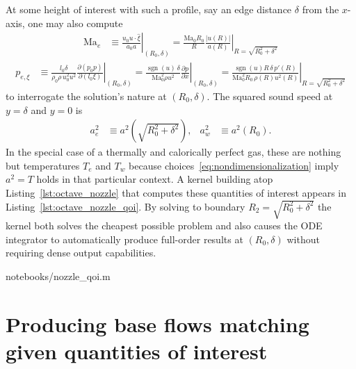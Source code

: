 \documentclass[letterpaper,11pt,nointlimits,reqno]{amsart}
\newcommand{\Mach}[1][]{\mbox{Ma}_{#1}}
\begin{document}
At some height of interest with such a profile, say an edge distance $\delta$
from the $x$-axis, one may also compute
\begin{align}
  \Mach[e]{}
  &\equiv
  \left. \frac{u_0 u\cdot\hat{\xi}}{a_0 a} \right|_{\left(R_0,\delta\right)}
  =
  \left.
    \frac{\Mach[0]{} R_0}{R}
    \frac{\left|u\!\left(R\right)\right|}
         {      a\!\left(R\right)       }
  \right|_{R = \sqrt{R_0^2 + \delta^2}}
\end{align}
\begin{align}
  p_{e,\xi}
  &\equiv
  \left.
  \frac{l_0 \delta}{\rho_0 \rho \, u_0^2 u^2}
    \frac{\partial\left(p_0 p\right)}{\partial\left(l_0 \xi\right)}
  \right|_{\left(R_0,\delta\right)}
  =
  \left.
    \frac{\operatorname{sgn}(u) \, \delta}{\Mach[0]^2 \rho u^2}
      \frac{\partial{}p}{\partial{}x}
  \right|_{\left(R_0,\delta\right)}
  =
  \left.
    \frac{\operatorname{sgn}(u) R \, \delta \, p'\!\left(R\right)}
         {\Mach[0]^2 R_0 \, \rho\!\left(R\right) u^2\!\left(R\right)}
  \right|_{R=\sqrt{R_0^2 + \delta^2}}
\end{align}
to interrogate the solution's nature at $\left(R_0, \delta\right)$.  The squared
sound speed at $y=\delta$ and $y=0$ is
\begin{align}
  a^2_e
  &\equiv
  a^2\!\left(\sqrt{R_0^2 + \delta^2}\right)
,
&
  a^2_w
  &\equiv
  a^2\!\left(R_0\right)
.
\end{align}
In the special case of a thermally and calorically perfect gas, these are
nothing but temperatures $T_e$ and $T_w$ because
choices~\eqref{eq:nondimensionalization} imply $a^2 = T$ holds in that
particular context.  A kernel building atop Listing~\ref{lst:octave_nozzle}
that computes these quantities of interest appears in
Listing~\ref{lst:octave_nozzle_qoi}.  By solving to boundary $R_2 = \sqrt{R_0^2
+ \delta^2}$ the kernel both solves the cheapest possible problem and also
causes the ODE integrator to automatically produce full-order results at
$\left(R_0,\delta\right)$ without requiring dense output capabilities.


                {notebooks/nozzle_qoi.m}

\pagebreak[4]{}

\section{Producing base flows matching given quantities of interest}
\end{document}

